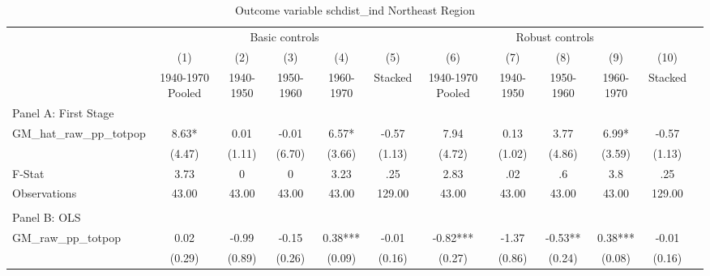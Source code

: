  \begin{table}[htbp]\centering {} \begin{threeparttable} \caption{Outcome variable schdist\_ind Northeast Region} \begin{tabular}{l*{11}{c}} \toprule
          &\multicolumn{5}{c}{Basic controls}                                   &\multicolumn{5}{c}{Robust controls}                                  \\\cmidrule(lr){2-6}\cmidrule(lr){7-11}
          &\multicolumn{1}{c}{(1)}&\multicolumn{1}{c}{(2)}&\multicolumn{1}{c}{(3)}&\multicolumn{1}{c}{(4)}&\multicolumn{1}{c}{(5)}&\multicolumn{1}{c}{(6)}&\multicolumn{1}{c}{(7)}&\multicolumn{1}{c}{(8)}&\multicolumn{1}{c}{(9)}&\multicolumn{1}{c}{(10)}\\
          &\multicolumn{1}{c}{1940-1970 Pooled}&\multicolumn{1}{c}{1940-1950}&\multicolumn{1}{c}{1950-1960}&\multicolumn{1}{c}{1960-1970}&\multicolumn{1}{c}{Stacked}&\multicolumn{1}{c}{1940-1970 Pooled}&\multicolumn{1}{c}{1940-1950}&\multicolumn{1}{c}{1950-1960}&\multicolumn{1}{c}{1960-1970}&\multicolumn{1}{c}{Stacked}\\
\cmidrule(lr){1-11}
\multicolumn{10}{l}{Panel A: First Stage}\\
\cmidrule(lr){1-11}
GM\_hat\_raw\_pp\_totpop&      8.63*  &      0.01   &     -0.01   &      6.57*  &     -0.57   &      7.94   &      0.13   &      3.77   &      6.99*  &     -0.57   \\
          &    (4.47)   &    (1.11)   &    (6.70)   &    (3.66)   &    (1.13)   &    (4.72)   &    (1.02)   &    (4.86)   &    (3.59)   &    (1.13)   \\
\midrule
F-Stat    &      3.73   &         0   &         0   &      3.23   &       .25   &      2.83   &       .02   &        .6   &       3.8   &       .25   \\
Observations&     43.00   &     43.00   &     43.00   &     43.00   &    129.00   &     43.00   &     43.00   &     43.00   &     43.00   &    129.00   \\
\cmidrule[\heavyrulewidth](lr){1-11} \\ \cmidrule[\heavyrulewidth](lr){1-11}
\multicolumn{10}{l}{Panel B: OLS}\\
\cmidrule(lr){1-11}
GM\_raw\_pp\_totpop&      0.02   &     -0.99   &     -0.15   &      0.38***&     -0.01   &     -0.82***&     -1.37   &     -0.53** &      0.38***&     -0.01   \\
          &    (0.29)   &    (0.89)   &    (0.26)   &    (0.09)   &    (0.16)   &    (0.27)   &    (0.86)   &    (0.24)   &    (0.08)   &    (0.16)   \\

\end{tabular}
\end{threeparttable}
\end{table}

